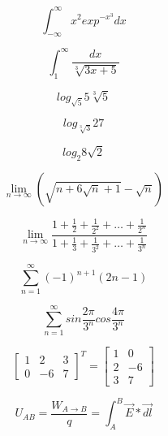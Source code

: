 \documentclass[12pt, letterpaper, titlepage]{article}
\begin{document}
$$ \int^{\infty}_{-\infty} x^{2}exp^{-x^{3}} dx $$

$$ \int^{\infty}_{1} \frac{dx}{\sqrt[3]{3x+5}} $$

$$ log_{\sqrt{5}} 5\sqrt[3]{5} $$

$$ log_{\sqrt[3]{3}}27 $$

$$ log_{2}8\sqrt{2} $$

$$ \lim_{n\rightarrow\infty} (\sqrt{n+6\sqrt{n}+1}-\sqrt{n}) $$

$$ \lim_{n\rightarrow\infty} \frac{1+\frac{1}{2}+\frac{1}{2^{2}}+ \ldots+\frac{1}{2^{n}}}{1+\frac{1}{3}+\frac{1}{3^{2}}+\ldots+\frac{1}{3^{n}}} $$

$$ \sum_{n=1}^{\infty} (-1)^{n+1}(2n-1) $$

$$ \sum_{n=1}^{\infty} sin\frac{2\pi}{3^{n}} cos \frac{4\pi}{3^{n}} $$

$$
\left[
\begin{array}{ccc}
1 & 2 & 3 \\
0 & -6 & 7 
\end{array}
\right]^{T}
=
\left[
\begin{array}{cc}
1 & 0 \\
2 & -6 \\
3 & 7 
\end{array} 
\right]$$

$$ U_{AB}= \frac{W_{A \rightarrow B}}{q} = \int_{A}^{B} \vec{E} \ast \vec{dl} $$
\end{document}
